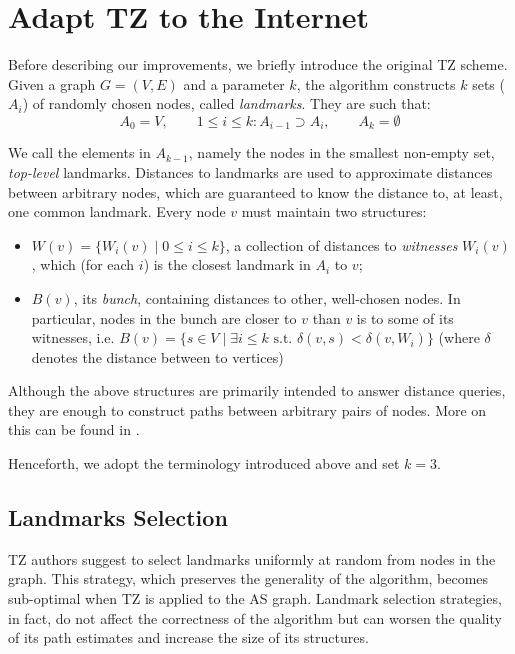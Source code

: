 \documentclass[a4paper,11pt,oneside]{report}
\begin{document}
\chapter{Adapt TZ to the Internet}
\label{chap.adapt-tz-internet}

Before describing our improvements, we briefly introduce the original TZ scheme. Given a graph $G=(V, E)$ and a parameter $k$, the algorithm constructs $k$ sets ($A_i$) of randomly chosen nodes, called \emph{landmarks}. They are such that:
\[
A_0 = V, \qquad 1 \leq i \leq k: A_{i-1} \supset A_i, \qquad A_k = \emptyset
\]

We call the elements in $A_{k-1}$, namely the nodes in the smallest non-empty set, \emph{top-level} landmarks.
Distances to landmarks are used to approximate distances between arbitrary nodes, which are guaranteed to know the distance to, at least, one common landmark. Every node $v$ must maintain two structures:
\begin{itemize}
\item $W(v) = \{W_i(v) \;|\; 0 \leq i \leq k \}$, a collection of distances to \emph{witnesses} $W_i(v)$, which (for each $i$) is the closest landmark in $A_i$ to $v$;
\item $B(v)$, its \emph{bunch}, containing distances to other, well-chosen nodes. In particular, nodes in the bunch are closer to $v$ than $v$ is to some of its witnesses, i.e. $B(v) = \{s \in V \;\vert\; \exists i \leq k \text{ s.t. } \delta(v, s) < \delta(v, W_i)\}$ (where $\delta$ denotes the distance between to vertices)
\end{itemize}

Although the above structures are primarily intended to answer distance queries, they are enough to construct paths between arbitrary pairs of nodes. More on this can be found in \cite{thorupApproximateDistanceOracles2005}.

Henceforth, we adopt the terminology introduced above and set $k=3$.

\section{Landmarks Selection}
\label{sec.landmarks-sel}
TZ authors suggest to select landmarks uniformly at random from nodes in the graph. This strategy, which preserves the generality of the algorithm, becomes sub-optimal when TZ is applied to the AS graph. Landmark selection strategies, in fact, do not aﬀect the correctness of the algorithm but can worsen the quality of its path estimates and increase the size of its structures. 
\end{document}
